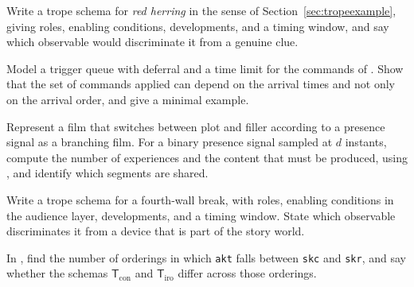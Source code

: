\begin{exercise}
Write a trope schema for \emph{red herring} in the sense of Section~\ref{sec:tropeexample}, giving roles, enabling conditions, developments, and a timing window, and say which observable would discriminate it from a genuine clue.
\end{exercise}

\begin{exercise}
Model a trigger queue with deferral and a time limit for the commands of . Show that the set of commands applied can depend on the arrival times and not only on the arrival order, and give a minimal example.
\end{exercise}

\begin{exercise}
Represent a film that switches between plot and filler according to a presence signal as a branching film. For a binary presence signal sampled at $d$ instants, compute the number of experiences and the content that must be produced, using , and identify which segments are shared.
\end{exercise}

\begin{exercise}
Write a trope schema for a fourth-wall break, with roles, enabling conditions in the audience layer, developments, and a timing window. State which observable discriminates it from a device that is part of the story world.
\end{exercise}

\begin{exercise}
In , find the number of orderings in which \texttt{akt} falls between \texttt{skc} and \texttt{skr}, and say whether the schemas $\mathsf{T}_{\mathrm{con}}$ and $\mathsf{T}_{\mathrm{iro}}$ differ across those orderings.
\end{exercise}
